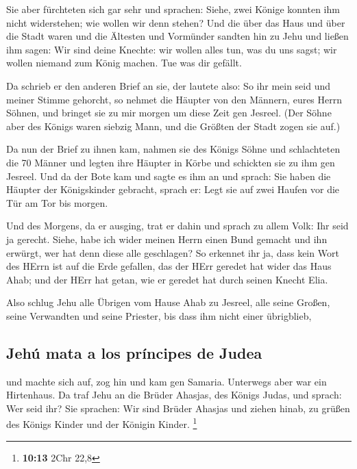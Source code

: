  Sie aber fürchteten sich gar sehr und sprachen: Siehe,
zwei Könige konnten ihm nicht widerstehen; wie wollen wir denn stehen?
 Und die über das Haus und über die Stadt waren und die
Ältesten und Vormünder sandten hin zu Jehu und ließen ihm sagen: Wir
sind deine Knechte: wir wollen alles tun, was du uns sagst; wir wollen
niemand zum König machen. Tue was dir gefällt.

 Da schrieb er den anderen Brief an sie, der lautete also:
So ihr mein seid und meiner Stimme gehorcht, so nehmet die Häupter von
den Männern, eures Herrn Söhnen, und bringet sie zu mir morgen um diese
Zeit gen Jesreel. (Der Söhne aber des Königs waren siebzig Mann, und die
Größten der Stadt zogen sie auf.)

 Da nun der Brief zu ihnen kam, nahmen sie des Königs
Söhne und schlachteten die 70 Männer und legten ihre Häupter in Körbe
und schickten sie zu ihm gen Jesreel.  Und da der Bote kam
und sagte es ihm an und sprach: Sie haben die Häupter der Königskinder
gebracht, sprach er: Legt sie auf zwei Haufen vor die Tür am Tor bis
morgen.

 Und des Morgens, da er ausging, trat er dahin und sprach
zu allem Volk: Ihr seid ja gerecht. Siehe, habe ich wider meinen Herrn
einen Bund gemacht und ihn erwürgt, wer hat denn diese alle geschlagen?
 So erkennet ihr ja, dass kein Wort des HErrn ist auf die
Erde gefallen, das der HErr geredet hat wider das Haus Ahab; und der
HErr hat getan, wie er geredet hat durch seinen Knecht Elia.

 Also schlug Jehu alle Übrigen vom Hause Ahab zu Jesreel,
alle seine Großen, seine Verwandten und seine Priester, bis dass ihm
nicht einer übrigblieb,

\hypertarget{jehuxfa-mata-a-los-pruxedncipes-de-judea}{%
\subsection{Jehú mata a los príncipes de
Judea}\label{jehuxfa-mata-a-los-pruxedncipes-de-judea}}

 und machte sich auf, zog hin und kam gen Samaria.
Unterwegs aber war ein Hirtenhaus.  Da traf Jehu an die
Brüder Ahasjas, des Königs Judas, und sprach: Wer seid ihr? Sie
sprachen: Wir sind Brüder Ahasjas und ziehen hinab, zu grüßen des Königs
Kinder und der Königin Kinder. \footnote{\textbf{10:13} 2Chr 22,8}

